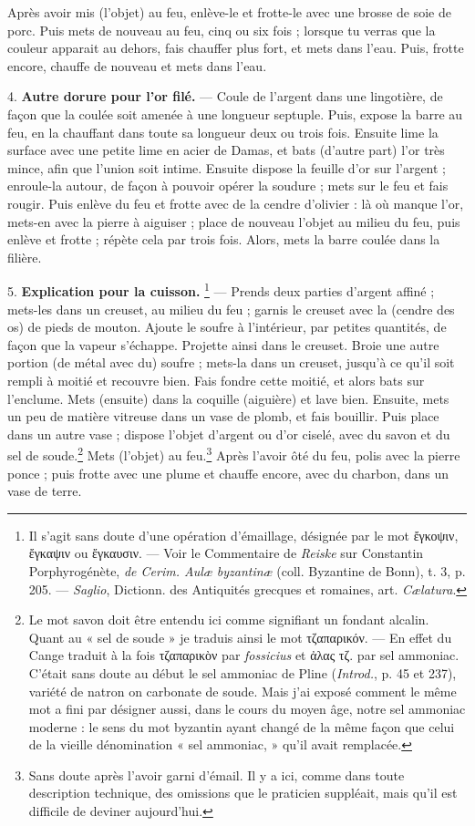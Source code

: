 \documentclass[a4paper, 11pt, oneside, polutonikogreek, french]{article}
\begin{document}
Après avoir mis (l'objet) au feu, enlève-le et frotte-le avec une brosse de soie de porc. Puis mets de nouveau au feu, cinq ou six fois ; lorsque tu verras que la couleur apparait au dehors, fais chauffer plus fort, et mets dans l'eau. Puis, frotte encore, chauffe de nouveau et mets dans l'eau.

4. \textbf{Autre dorure pour l'or filé.} --- Coule de l'argent dans une lingotière, de façon que la coulée soit amenée à une longueur septuple. Puis, expose la barre au feu, en la chauffant dans toute sa longueur deux ou trois fois. Ensuite lime la surface avec une petite lime en acier de Damas, et bats (d'autre part) l'or très mince, afin que l'union soit intime. Ensuite dispose la feuille d'or sur l'argent ; enroule-la autour, de façon à pouvoir opérer la soudure ; mets sur le feu et fais rougir. Puis enlève du feu et frotte avec de la cendre d'olivier : là où manque l'or, mets-en avec la pierre à aiguiser ; place de nouveau l'objet au milieu du feu, puis enlève et frotte ; répète cela par trois fois. Alors, mets la barre coulée dans la filière.

5. \textbf{Explication pour la cuisson.} \footnote{Il s'agit sans doute d'une opération d'émaillage, désignée par le mot ἔγκοψιν, ἔγκαψιν ou ἔγκαυσιν. --- Voir le Commentaire de \emph{Reiske} sur Constantin Porphyrogénète, \emph{de Cerim. Aulæ byzantinæ} (coll. Byzantine de Bonn), t. 3, p. 205. --- \emph{Saglio}, Dictionn. des Antiquités grecques et romaines, art. \emph{Cælatura}.} --- Prends deux parties d'argent affiné ; mets-les dans un creuset, au milieu du feu ; garnis le creuset avec la (cendre des os) de pieds de mouton. Ajoute le soufre à l'intérieur, par petites quantités, de façon que la vapeur s'échappe. Projette ainsi dans le creuset. Broie une autre portion (de métal avec du) soufre ; mets-la dans un creuset, jusqu'à ce qu'il soit rempli à moitié et recouvre bien. Fais fondre cette moitié, et alors bats sur l'enclume. Mets (ensuite) dans la coquille (aiguière) et lave bien. Ensuite, mets un peu de matière vitreuse dans un vase de plomb, et fais bouillir. Puis place dans un autre vase ; dispose l'objet d'argent ou d'or ciselé, avec du savon et du sel de soude.\footnote{Le mot savon doit être entendu ici comme signifiant un fondant alcalin. Quant au « sel de soude » je traduis ainsi le mot τζαπαρικόν. --- En effet du Cange traduit à la fois τζαπαρικὸν par \emph{fossicius} et ἀλας τζ. par sel ammoniac. C'était sans doute au début le sel ammoniac de Pline (\emph{Introd.}, p. 45 et 237), variété de natron on carbonate de soude. Mais j'ai exposé comment le même mot a fini par désigner aussi, dans le cours du moyen âge, notre sel ammoniac moderne : le sens du mot byzantin ayant changé de la même façon que celui de la vieille dénomination « sel ammoniac, » qu'il avait remplacée.} Mets (l'objet) au feu.\footnote{Sans doute après l'avoir garni d'émail. Il y a ici, comme dans toute description technique, des omissions que le praticien suppléait, mais qu'il est difficile de deviner aujourd'hui.} Après l'avoir ôté du feu, polis avec la pierre ponce ; puis frotte avec une plume et chauffe encore, avec du charbon, dans un vase de terre.
\end{document}
